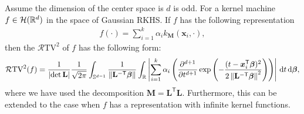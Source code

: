 \begin{theorem}\label{thm: rtv}
    Assume the dimension of the center space is $d$ is odd.
    For a kernel machine $f \in {\mathcal{H}}(\mathbb{R}^d)$ in the space of Gaussian RKHS. If $f$ has the following representation
    \begin{align*}
        f(\cdot) = \sum_{i =1}^k \alpha_i k_{\mathbf{M}}(\bm{x}_i,\cdot),
    \end{align*}
    then the $\mathcal{R}\mathrm{TV}^2$ of $f$ has the following form:
    \[
\mathcal{R}\mathrm{TV}^2(f) = \frac{1}{\left|\det \mathbf{L}\right|} \frac{1}{\sqrt{2\pi}} \int_{\mathbb{S}^{d-1}} \frac{1}{{\left\|\mathbf{L}^{-\mathsf{T}}\bm{\beta}\right\|}} 
    \int_\mathbb{R}
    \left|\sum_{i=1}^k \alpha_i  \left( {\frac{\partial^{d+1}}{\partial t^{d+1}} \exp \left( {-\frac{(t-\bm{x}_i^\mathsf{T}\bm{\beta})^2}{2\left\|\mathbf{L}^{-\mathsf{T}}\bm{\beta}\right\|^2}} \right) } \right) \right| \,\mathrm{d}t\,\mathrm{d}\bm{\beta},
\]
where we have used the decomposition $\mathbf{M} = \mathbf{L}^\mathsf{T}\mathbf{L}$.
Furthermore, this can be extended to the case when $f$ has a representation with infinite kernel functions.
\end{theorem}

